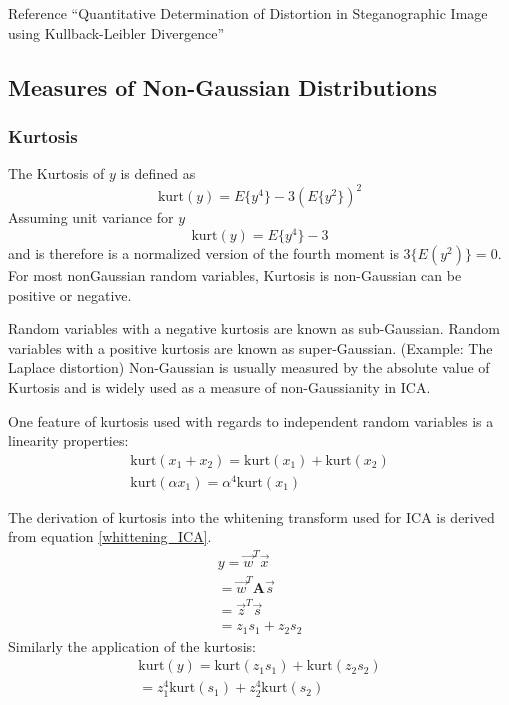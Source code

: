 \documentclass[]{article}
\begin{document}
Reference ``Quantitative Determination of Distortion in Steganographic Image using Kullback-Leibler Divergence''

\subsection{Measures of Non-Gaussian Distributions}
\subsubsection{Kurtosis}
The Kurtosis of $y$ is defined as 
\begin{equation}
\textrm{kurt}(y) = E \{ y^4 \} -3 ( E \{ y^2 \})^2
\end{equation}
Assuming unit variance for $y$
\begin{equation}
\textrm{kurt}(y) = E \{ y^4 \} - 3
\end{equation}
and is therefore is a normalized version of the fourth moment is $3 \{ E (y^2 ) \} = 0$.  
For most nonGaussian random variables, Kurtosis is non-Gaussian can be positive or negative. 

Random variables with a negative kurtosis are known as sub-Gaussian.  Random variables with a positive kurtosis are known as super-Gaussian.  (Example:  The Laplace distortion) %
Non-Gaussian is usually measured by the absolute value of Kurtosis and is widely used as a measure of non-Gaussianity in ICA.   

One feature of kurtosis used with regards to independent random variables is a linearity properties:
\begin{eqnarray}
	\textrm{kurt}(x_1 + x_2) = \textrm{kurt}(x_1) + \textrm{kurt}(x_2) \\
	\textrm{kurt}(\alpha x_1) = \alpha^4 \textrm{kurt}(x_1)
\end{eqnarray}

The derivation of kurtosis into the whitening transform used for ICA is derived from equation \ref{whittening_ICA}. 
\begin{eqnarray}
	y = \vec{w}^T \vec{x} \\
	= \vec{w}^T \mathbf{A}\vec{s} \\
	= \vec{z}^T \vec{s} \\
	= z_1 s_1 + z_2 s_2 
\end{eqnarray}
Similarly the application of the kurtosis:
\begin{eqnarray}
	\textrm{kurt}(y) = \textrm{kurt}(z_1 s_1) + \textrm{kurt}(z_2 s_2) \\
	= z_1 ^4 \textrm{kurt}(s_1) + z_2 ^4 \textrm{kurt}(s_2)
\end{eqnarray}
\end{document}
